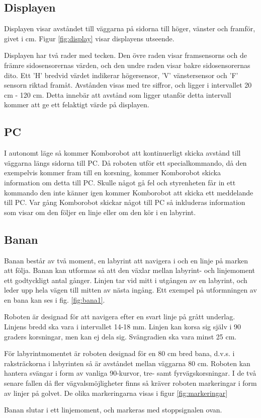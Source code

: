 \subsection{Displayen}
Displayen visar avståndet till väggarna på sidorna till höger, vänster och framför, givet i cm. Figur \ref{fig:display} visar displayens utseende. 


Displayen har två rader med tecken. Den övre raden visar framsensorns och de 
främre sidosensorernas värden, och den undre raden visar bakre 
sidosensorernas dito. Ett 'H' bredvid värdet indikerar högersensor, 'V' 
vänstersensor och 'F' sensorn riktad framåt. Avstånden visas med tre 
siffror, och ligger i intervallet 20 cm - 120 cm. Detta innebär att avstånd 
som ligger utanför detta intervall kommer att ge ett felaktigt värde på 
displayen.

\subsection{PC}
I autonomt läge så kommer Komborobot att kontinuerligt skicka avstånd till
väggarna längs sidorna till PC. Då roboten utför ett specialkommando, då den
exempelvis kommer fram till en korsning,  kommer Komborobot skicka information om
detta till PC. Skulle något gå fel och styrenheten får in ett kommando den inte
känner igen kommer Komborobot att skicka ett meddelande till PC. Var gång
Komborobot skickar något till PC så inkluderas information som visar om den följer en
linje eller om den kör i en labyrint.
\subsection{Banan}
\label{sec:banan}

Banan består av två moment, en labyrint att navigera i och en linje på marken att följa. Banan kan utformas så att den växlar mellan labyrint- och linjemoment ett godtyckligt antal gånger. Linjen tar vid mitt i utgången av en labyrint, och leder upp hela vägen till mitten av nästa ingång. Ett exempel på utformningen av en bana kan ses i fig. \ref{fig:bana1}.


Roboten är designad för att navigera efter en svart linje på grått underlag. Linjens bredd ska vara i intervallet 14-18 mm. Linjen kan korsa sig själv i 90 graders korsningar, men kan ej dela sig. Svängradien ska vara minst 25 cm. 

För labyrintmomentet är roboten designad för en 80 cm bred bana, d.v.s. i raksträckorna i labyrinten så är avståndet mellan väggarna 80 cm. Roboten kan hantera svängar i form av vanliga 90\degree-kurvor, tre- samt fyrvägskorsningar. I de två senare fallen då fler vägvalsmöjligheter finns så kräver roboten markeringar i form av linjer på golvet. De olika markeringarna visas i figur \ref{fig:markeringar}


Banan slutar i ett linjemoment, och markeras med stoppsignalen ovan. 

